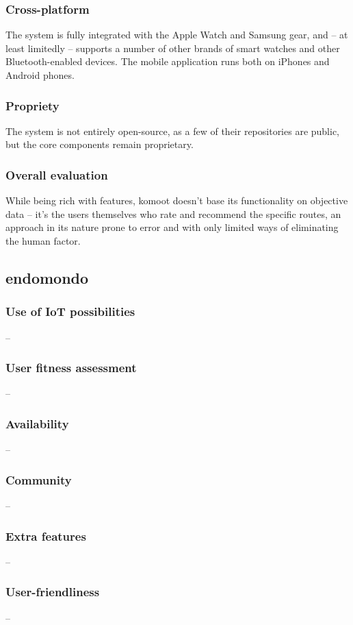 \subsubsection*{Cross-platform} The system is fully integrated with the Apple Watch and Samsung gear, and -- at least limitedly -- supports a number of other brands of smart watches and other Bluetooth-enabled devices.
The mobile application runs both on iPhones and Android phones.
\subsubsection*{Propriety} The system is not entirely open-source, as a few of their repositories are public, but the core components remain proprietary. 

\subsubsection*{Overall evaluation}
While being rich with features, komoot doesn't base its functionality on objective data -- it's the users themselves who rate and recommend the specific routes,
an approach in its nature prone to error and with only limited ways of eliminating the human factor.

\subsection{endomondo}

\subsubsection*{Use of IoT possibilities} --
\subsubsection*{User fitness assessment} --
\subsubsection*{Availability} --
\subsubsection*{Community} -- 
\subsubsection*{Extra features} -- 
\subsubsection*{User-friendliness} -- 

